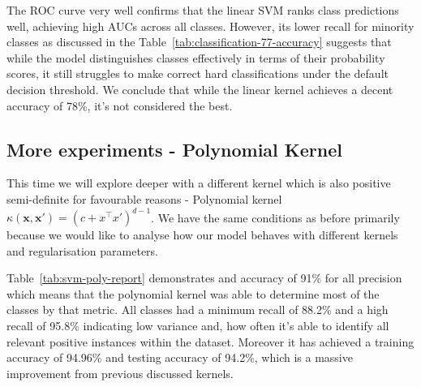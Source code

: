 \documentclass[10pt,twocolumn]{article}
\begin{document}
The ROC curve very well confirms that the linear SVM ranks class predictions well, achieving high AUCs across all classes. However, its lower recall for minority classes as discussed in the Table~\ref{tab:classification-77-accuracy} suggests that while the model distinguishes classes effectively in terms of their probability scores, it still struggles to make correct hard classifications under the default decision threshold.
We conclude that while the linear kernel achieves a decent accuracy of 78\%, it's not considered the best.

\subsection{More experiments - Polynomial Kernel}

This time we will explore deeper with a different kernel which is also positive semi-definite for favourable reasons - Polynomial kernel $\kappa(\mathbf{x}, \mathbf{x}') = (c + \mathbf{}{x}^\top \mathbf{}{x}')^{d - 1}$. We have the same conditions as before primarily because we would like to analyse how our model behaves with different kernels and regularisation parameters.

\begin{table}[H]
\centering
\caption{Classification Report (Polynomial kernel)}
\label{tab:svm-poly-report}
\end{table}
Table~\ref{tab:svm-poly-report} demonstrates and accuracy of 91\% for all precision which means that the polynomial kernel was able to determine most of the classes by that metric. All classes had a minimum recall of 88.2\% and a high recall of 95.8\% indicating low variance and, how often it's able to identify all relevant positive instances within the dataset. Moreover it has achieved a training accuracy of 94.96\% and testing accuracy of 94.2\%, which is a massive improvement from previous discussed kernels. 
\end{document}
